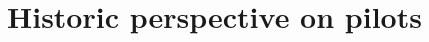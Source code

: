 \documentclass{sig-alternate}
\begin{document}
\section{Historic perspective on pilots}
\label{sec:history}






\end{document}
